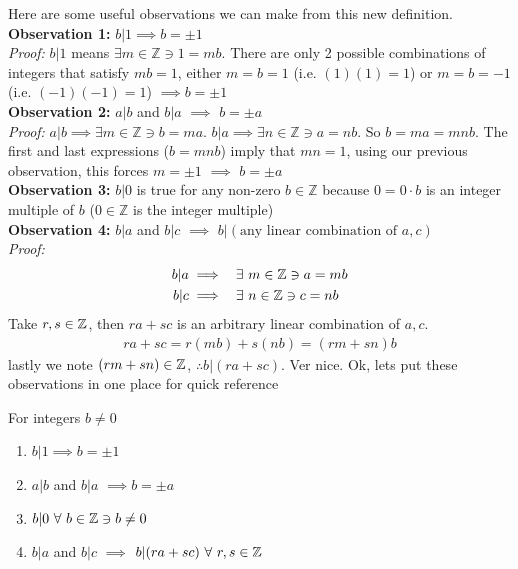 \noindent Here are some useful observations we can make from this new definition.\steezybreak\\
\noindent\textbf{Observation 1:} $b|1\implies b=\pm 1$\\
\textit{Proof:} $b|1$ means $\exists m\in \mathbb{Z}\ni 1=mb$. There are only 2 possible combinations of integers that satisfy $mb=1$, either $m=b=1$ (i.e. $(1)(1)=1$) or $m=b=-1$ (i.e. $(-1)(-1)=1$) $\implies b=\pm 1$ \steezybreak\\
\noindent\textbf{Observation 2:} $a|b$ and $b|a$ $\implies$ $b=\pm a$ \steezybreak\\
\textit{Proof:} $a|b \implies \exists m \in \mathbb{Z} \ni b= ma$. $b|a \implies \exists n \in \mathbb{Z} \ni a= nb$. So $b=ma=mnb$. The first and last expressions ($b=mnb$) imply that $mn=1$, using our previous observation, this forces $m=\pm 1$ $\implies$ $b=\pm a$\steezybreak\\
\noindent\textbf{Observation 3:} $b|0$ is true for any non-zero $b\in \mathbb{Z}$ because $0=0\cdot b$ is an integer multiple of $b$ ($0\in \mathbb{Z}$ is the integer multiple)\steezybreak\\
\noindent\textbf{Observation 4:}  $b|a$ and $b|c$ $\implies$ $b|(\text{any linear combination of }a,c)$ \steezybreak\\
\textit{Proof:} 
\begin{align}
    b|a &\implies \ \ \exists \ m \in {\mathbb{ Z}} \ni a=mb \nonumber \\
    b|c &\implies \ \ \exists \ n \in {\mathbb{ Z}} \ni c=nb \nonumber
\end{align}
Take $r,s\in {\mathbb{ Z}}$, then $ra+sc$ is an arbitrary linear combination of $a,c$.
\begin{align}
    ra+sc=r(mb)+s(nb)=(rm+sn)b\nonumber
\end{align}
lastly we note $(rm+sn)\in {\mathbb{ Z}}$, $\therefore b|(ra+sc)$.
\noindent Ver nice. Ok, lets put these observations in one place for quick reference
\begin{proposition} 
For integers $b\neq 0$
\begin{enumerate}
    \item $b|1\implies b=\pm 1$
    \item $a|b$ and $b|a$ $\implies b=\pm a$
    \item $b|0 \ \forall \ b \in {\mathbb{ Z}} \ni b\neq 0$
    \item $b|a$ and $b|c$ $\implies$ $b|(ra+sc) \ \forall \ r,s \in {\mathbb{ Z}}$
\end{enumerate}
\end{proposition}
